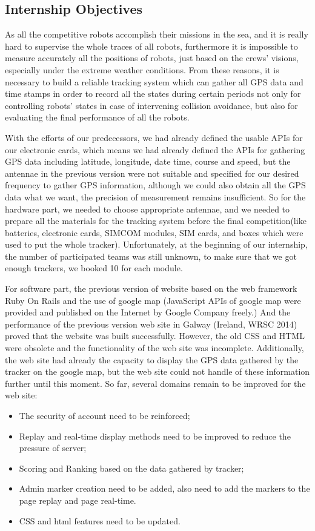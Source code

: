 \subsection{Internship Objectives}
As all the competitive robots accomplish their missions in the sea, and it is really hard to supervise the whole traces of all robots, furthermore it is impossible to measure accurately all the positions of robots, just based on the crews' visions, especially under the extreme weather conditions. From these reasons, it is necessary to build a reliable tracking system which can gather all GPS data and time stamps in order to record all the states during certain periods not only for controlling robots' states in case of intervening collision avoidance, but also for evaluating the final performance of all the robots.

With the efforts of our predecessors, we had already defined the usable APIs for our electronic cards, which means we had already defined the APIs for gathering GPS data including latitude, longitude, date time, course and speed, but the antennae in the previous version were not suitable and specified for our desired frequency to gather GPS information, although we could also obtain all the GPS data what we want, the precision of measurement remains insufficient. So for the hardware part, we needed to choose appropriate antennae, and we needed to prepare all the materials for the tracking system before the final competition(like batteries, electronic cards, SIMCOM modules, SIM cards, and boxes which were used to put the whole tracker). Unfortunately, at the beginning of our internship, the number of participated teams was still unknown, to make sure that we got enough trackers, we booked 10 for each module. 

For software part, the previous version of website based on the web framework Ruby On Rails and the use of google map (JavaScript APIs of google map were provided and published on the Internet by Google Company freely.) And the performance of the previous version web site in Galway (Ireland, WRSC 2014) proved that the website was built successfully. However, the old CSS and HTML were obsolete and the functionality of the web site was incomplete. Additionally, the web site had already the capacity to display the GPS data gathered by the tracker on the google map, but the web site could not handle of these information further until this moment. So far, several domains remain to be improved for the web site:
\begin{itemize}
\item The security of account need to be reinforced; 
\item Replay and real-time display methods need to be improved to reduce the pressure of server;
\item Scoring and Ranking based on the data gathered by tracker;
\item Admin marker creation need to be added, also need to add the markers to the page replay and page real-time.
\item CSS and html features need to be updated.
\end{itemize}



